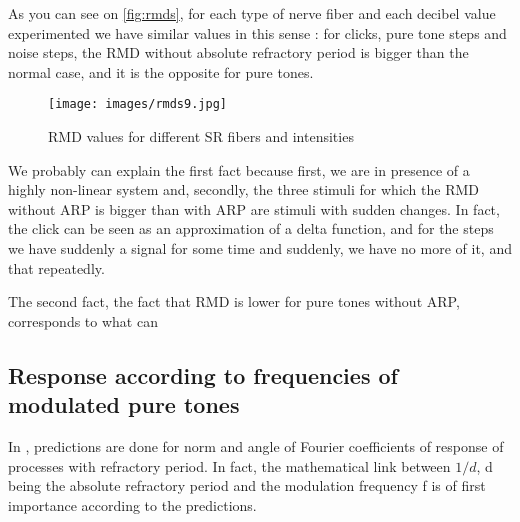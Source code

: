 As you can see on \autoref{fig:rmds}, for each type of nerve fiber and 
each decibel value experimented we have similar values in this sense :
for clicks, pure tone steps and noise steps, the RMD without absolute refractory
period is bigger than the normal case, and it is the opposite for pure tones.


\begin{figure*}[ht]
	\centering
  \texttt{[image: images/rmds9.jpg]}
	\caption{RMD values for different SR fibers and intensities}
	\label{fig:rmds}
\end{figure*}

We probably can explain the first fact because first, we are in presence of a highly 
non-linear system and, 
secondly, the three stimuli for which the RMD without ARP is bigger than with 
ARP are stimuli with sudden changes. 
In fact, the click can be seen as an approximation of a delta function, 
and for the steps we have suddenly a signal for some time and suddenly, 
we have no more of it, and that repeatedly. %

The second fact, the fact that RMD is lower for pure tones without ARP, 
corresponds to what can %

\subsection{Response according to frequencies of modulated pure tones}

In \cite{Deger}, predictions are done for norm and angle of Fourier coefficients of 
response of processes with refractory period.
In fact, the mathematical link between $1/d$, d being the absolute refractory period
and the modulation frequency f is of first importance according to the predictions.







 